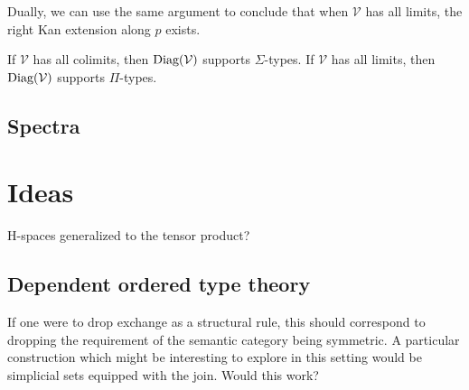 Dually, we can use the same argument to conclude that when $\mathcal{V}$ has all limits, the right Kan extension along $p$ exists.
\begin{cor}
If $\mathcal{V}$ has all colimits, then $\operatorname{\text{Diag}}(\mathcal{V})$ supports $\Sigma$-types. If $\mathcal{V}$ has all limits, then $\operatorname{\text{Diag}}(\mathcal{V})$ supports $\Pi$-types.
\end{cor}
\subsection{Spectra}

\newpage


\section{Ideas}
H-spaces generalized to the tensor product?
\subsection{Dependent ordered type theory}
If one were to drop exchange as a structural rule, this should correspond to dropping the requirement of the semantic category being symmetric. A particular construction which might be interesting to explore in this setting would be simplicial sets equipped with the join. Would this work?
\nocite{benton1995mixed}
\nocite{hofmann1997syntax}




